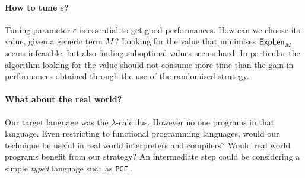 \paragraph{How to tune $\varepsilon$?} Tuning parameter $\varepsilon$ is essential to get good performances. How can we choose its value, given a generic term $M$? Looking for the value that minimises $\textsf{ExpLen}_{M}$ seems infeasible, but also finding suboptimal values seems hard. In particular the algorithm looking for the value should not consume more time than the gain in performances obtained through the use of the randomised strategy.
\paragraph{What about the real world?} Our target language was the $\lambda$-calculus. However no one programs in that language. Even restricting to functional programming languages, would our technique be useful in real world interpreters and compilers? Would real world programs benefit from our strategy? An intermediate step could be considering a simple \emph{typed} language such as \texttt{PCF} \cite{plotkin_lcf_1977}. 